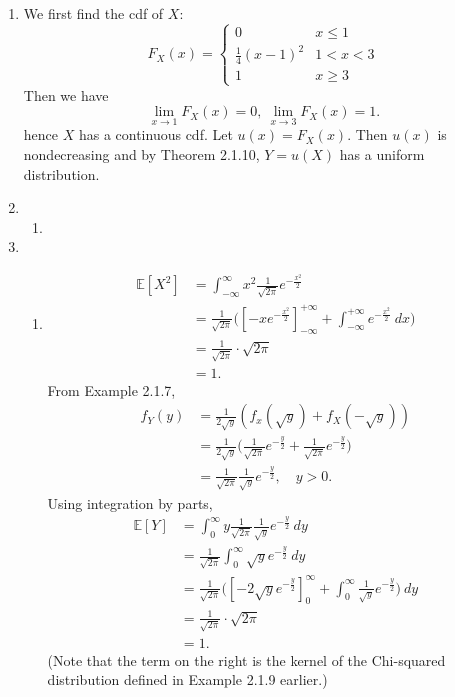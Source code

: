 \documentclass{article}
\begin{document}
\begin{enumerate}
    \item We first find the cdf of $X$:
    \[ F_{X}(x) = \begin{cases}
        0 & x \leq 1 \\
        \frac{1}{4}(x - 1)^2 & 1 < x < 3 \\
        1 & x \geq 3
    \end{cases} \]
    Then we have 
    \[ \lim_{x \to 1} F_{X}(x) = 0, \ \lim_{x \to 3} F_{X}(x) = 1. \]
    hence $X$ has a continuous cdf. Let $u(x) = F_{X}(x)$. Then $u(x)$ is nondecreasing and by 
    Theorem 2.1.10, $Y = u(X)$ has a uniform distribution.

    \item \begin{enumerate}
        \item 
    \end{enumerate}

    \item \begin{enumerate}
        \item \begin{align*}
            \mathbb{E}[X^2]
            &= \int_{-\infty}^{\infty} x^2 \frac{1}{\sqrt{2\pi}}e^{-\frac{x^2}{2}} \\
            &= \frac{1}{\sqrt{2\pi}} \Big( [-xe^{-\frac{x^2}{2}}]_{-\infty}^{+\infty} 
            + \int_{-\infty}^{+\infty} e^{-\frac{x^2}{2}} \ dx \Big) \\
            &= \frac{1}{\sqrt{2\pi}} \cdot \sqrt{2\pi} \\
            &= 1.
        \end{align*}
        From Example 2.1.7, 
        \begin{align*}
            f_{Y}(y) 
            &= \frac{1}{2\sqrt{y}} (f_{x}(\sqrt{y}) + f_{X}(-\sqrt{y})) \\
            &= \frac{1}{2\sqrt{y}} \Big( \frac{1}{\sqrt{2\pi}} e^{-\frac{y}{2}} 
            + \frac{1}{\sqrt{2\pi}} e^{-\frac{y}{2}} \Big) \\
            &= \frac{1}{\sqrt{2\pi}} \frac{1}{\sqrt{y}} e^{-\frac{y}{2}}, \quad y > 0.
        \end{align*}
        Using integration by parts, 
        \begin{align*}
            \mathbb{E}[Y]
            &= \int_{0}^{\infty} y \frac{1}{\sqrt{2\pi}} \frac{1}{\sqrt{y}} 
            e^{-\frac{y}{2}} \ dy \\
            &= \frac{1}{\sqrt{2\pi}} \int_{0}^{\infty} \sqrt{y} e^{-\frac{y}{2}} \ dy \\
            &= \frac{1}{\sqrt{2\pi}} \Big( [-2\sqrt{y}e^{-\frac{y}{2}}]_{0}^{\infty} 
            + \int_{0}^{\infty} \frac{1}{\sqrt{y}}e^{-\frac{y}{2}}) \ dy \\
            &= \frac{1}{\sqrt{2\pi}} \cdot \sqrt{2\pi} \\
            &= 1.
        \end{align*}
        (Note that the term on the right is the kernel of the Chi-squared distribution 
        defined in Example 2.1.9 earlier.)


\end{enumerate}
\end{enumerate}
\end{document}
